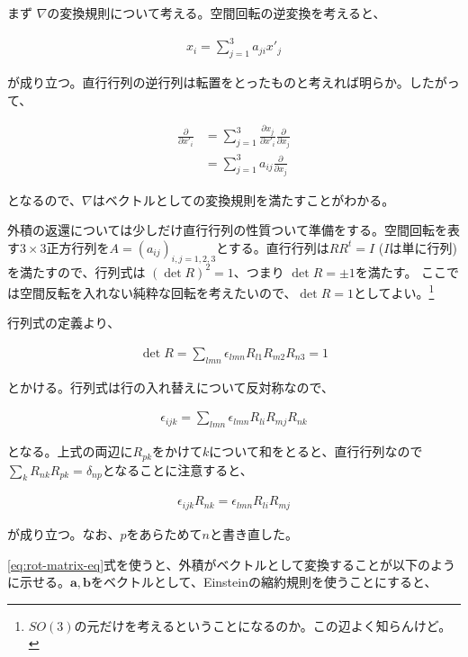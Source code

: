 \documentclass[a4j,12pt,uplatex,dvipdfmx]{jsreport}
\begin{document}
まず $\nabla$の変換規則について考える。空間回転の逆変換を考えると、

\begin{align*}
  x_i = \sum_{j=1}^{3} a_{ji} x'_j
\end{align*}

が成り立つ。直行行列の逆行列は転置をとったものと考えれば明らか。したがって、

\begin{align*}
  \frac{\partial}{\partial x'_i}
  &= \sum_{j=1}^{3} \frac{\partial x_j}{\partial x'_i} \frac{\partial}{\partial x_j} \\
  &= \sum_{j=1}^{3} a_{ij} \frac{\partial}{\partial x_j}
\end{align*}

となるので、$\nabla$はベクトルとしての変換規則を満たすことがわかる。

外積の返還については少しだけ直行行列の性質ついて準備をする。空間回転を表す$3 \times 3$正方行列を$A = (a_{ij})_{i,j=1,2,3}$とする。直行行列は$R R^{t} = I$ ($I$は単に行列)を満たすので、行列式は $(\det R)^2 = 1$、つまり $\det R = \pm 1$を満たす。
ここでは空間反転を入れない純粋な回転を考えたいので、$\det R = 1$としてよい。\footnote{$SO(3)$の元だけを考えるということになるのか。この辺よく知らんけど。}

行列式の定義より、

\begin{align*}
  \det R = \sum_{lmn} \epsilon_{lmn} R_{l1}  R_{m2}  R_{n3} = 1
\end{align*}

とかける。行列式は行の入れ替えについて反対称なので、

\begin{align}
  \epsilon_{ijk} = \sum_{lmn} \epsilon_{lmn} R_{li}  R_{mj}  R_{nk}
\end{align}

となる。上式の両辺に$R_{pk}$をかけて$k$について和をとると、直行行列なので$\sum_{k} R_{nk} R_{pk} = \delta_{np}$となることに注意すると、

\begin{align}
  \epsilon_{ijk} R_{nk} = \epsilon_{lmn} R_{li} R_{mj} \label{eq:rot-matrix-eq}
\end{align}

が成り立つ。なお、$p$をあらためて$n$と書き直した。

\eqref{eq:rot-matrix-eq}式を使うと、外積がベクトルとして変換することが以下のように示せる。$\bm{a},\bm{b}$をベクトルとして、Einsteinの縮約規則を使うことにすると、
\end{document}
